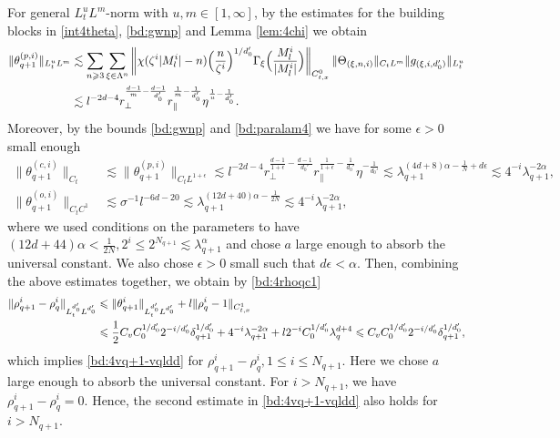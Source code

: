 \documentclass[10pt,a4paper]{amsart}
\numberwithin{equation}{section}
\def\({{\Big(}}
\def\){{\Big)}}
\newcommand{\norm}[1]{\left\|#1\right\|}
\def\geq{\geqslant}
\def\leq{\leqslant}
\def\({{\Big(}}
\def\){{\Big)}}
\def\geq{\geqslant}
\def\leq{\leqslant}
\begin{document}
For general $L_t^uL^m$-norm with $u,m\in[1,\infty]$, by the estimates for the building blocks in \eqref{int4theta}, \eqref{bd:gwnp} and Lemma \ref{lem:4chi} we obtain
\begin{align}
\|\theta_{q+1}^{(p,i)} \|_{L^u_tL^{m}}&\lesssim\sum_{n\geq3}\sum_{\xi\in\Lambda^{n}}\norm{\chi(\zeta^{i}|M^{i}_l|-n)\(\frac{n}{\zeta^{i}}\)^{1/d_0'}\Gamma_{\xi}\(\frac{M^{i}_l}{|M^{i}_l|}\)}_{C_{t,x}^0}\|\Theta_{(\xi,n,i)} \|_{C_tL^{m}}\|g_{(\xi,i,d_0')}\|_{L_t^{u}}\notag\\ 
&\lesssim l^{-2d-4}r_\perp^{\frac{d-1}{m}-\frac{d-1}{d_0'}} r_\parallel^{\frac{1}{m}-\frac{1}{d_0'}}\eta^{\frac1u-\frac{1}{d_0'}}.\label{bd:4theq+1plp}
\end{align}
Moreover, by the bounds \eqref{bd:gwnp} and \eqref{bd:paralam4} we have for some $\epsilon>0$ small enough
\begin{align}
\|\theta_{q+1}^{(c,i)} \|_{C_t}&\lesssim\|\theta_{q+1}^{(p,i)} \|_{C_tL^{1+\epsilon}}
\lesssim l^{-2d-4}r_\perp^{\frac{d-1}{1+\epsilon}-\frac{d-1}{d_0'}} r_\parallel^{\frac{1}{1+\epsilon}-\frac{1}{d_0'}}\eta^{-\frac{1}{d_0'}}\lesssim  \lambda_{q+1}^{(4d+8)\alpha-\frac1N+d\epsilon}\lesssim4^{-i} \lambda_{q+1}^{-2\alpha},\label{bd:4theq+1clp}\\
\|\theta_{q+1}^{(o,i)}\|_{C_tC^1}%
&\lesssim \sigma^{-1} l^{-6d-20}\lesssim \lambda_{q+1}^{(12d+40)\alpha-\frac1{2N}}\lesssim4^{-i} \lambda_{q+1}^{-2\alpha},\label{bd:4theq+1olp}
\end{align}
where we used  conditions on the parameters to have $(12d+44)\alpha<\frac1{2N},2^i\leq2^{N_{q+1}}\lesssim\lambda_{q+1}^{\alpha}$ and chose $a$ large enough to absorb the universal constant. We also chose $\epsilon>0$ small such that $d\epsilon<\alpha$.
Then, combining the above estimates together, we obtain by   \eqref{bd:4rhoqc1} 
\begin{align}
\|\rho^{i}_{q+1}-\rho^{i}_q\|_{L^{d_0'}_tL^{d_0'}}
&\leq\|\theta^{i}_{q+1}\|_{L^{d_0'}_tL^{d_0'}}+l\|\rho_q^i-1\|_{C_{t,x}^1}\notag\\
&\leq\frac12 C_v C_0^{1/{d_0'}}2^{-i/d_0'}\delta_{q+1}^{1/{d_0'}}+4^{-i} \lambda_{q+1}^{-2\alpha}+l2^{-i}C_0^{1/{d_0'}}  \lambda_q^{d+4}  \leq C_v C_0^{1/{d_0'}}2^{-i/d_0'}\delta_{q+1}^{1/{d_0'}},\notag
\end{align}
which implies \eqref{bd:4vq+1-vqldd} for $\rho^{i}_{q+1}-\rho_q^i,1\leq i\leq N_{q+1}$. Here we chose $a$ large enough to absorb the universal constant. For $i>N_{q+1}$, we have
$
\rho_{q+1}^i-\rho_q^i=0.
$
Hence, the second estimate in \eqref{bd:4vq+1-vqldd} also holds for $i>N_{q+1}$.
\end{document}
